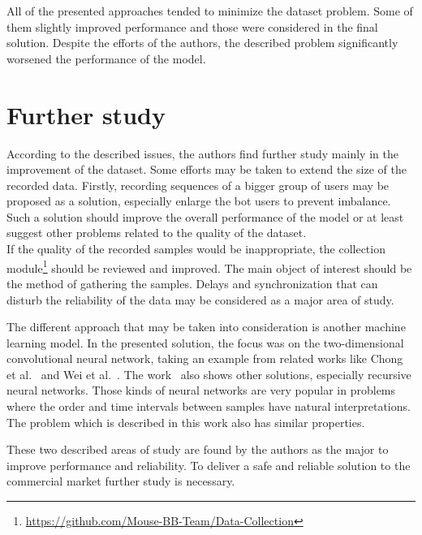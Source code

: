 All of the presented approaches tended to minimize the dataset problem.
Some of them slightly improved performance and those were considered in the final solution.
Despite the efforts of the authors, the described problem significantly worsened the performance of the model.

\section{Further study}\label{sec:further-study}
According to the described issues, the authors find further study mainly in the improvement of the dataset.
Some efforts may be taken to extend the size of the recorded data.
Firstly, recording sequences of a bigger group of users may be proposed as a solution, especially enlarge the bot users to prevent imbalance.
Such a solution should improve the overall performance of the model or at least suggest other problems related to the quality of the dataset.\\
If the quality of the recorded samples would be inappropriate, the collection module\footnote{\url{https://github.com/Mouse-BB-Team/Data-Collection}} should be reviewed and improved.
The main object of interest should be the method of gathering the samples.
Delays and synchronization that can disturb the reliability of the data may be considered as a major area of study.

The different approach that may be taken into consideration is another machine learning model.
In the presented solution, the focus was on the two-dimensional convolutional neural network, taking an example from related works like Chong et al.~\cite{Main} and Wei et al.~\cite{Inspiration}.
The work~\cite{Main} also shows other solutions, especially recursive neural networks.
Those kinds of neural networks are very popular in problems where the order and time intervals between samples have natural interpretations.
The problem which is described in this work also has similar properties.

These two described areas of study are found by the authors as the major to improve performance and reliability.
To deliver a safe and reliable solution to the commercial market further study is necessary.